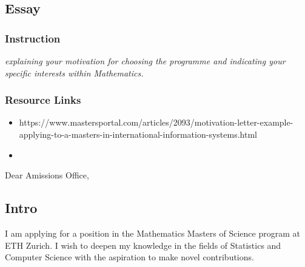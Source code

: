 \subsection*{Essay}\label{sec:essay}

\subsubsection*{Instruction}
\textit{explaining your motivation for choosing the programme and indicating your specific interests within Mathematics.}

\subsubsection*{Resource Links}
\begin{itemize}
    \item https://www.mastersportal.com/articles/2093/motivation-letter-example-applying-to-a-masters-in-international-information-systems.html
    \item 
\end{itemize}

Dear Amissions Office,\\
\subsection*{Intro}
I am applying for a position in the Mathematics Masters of Science program at ETH Zurich. I wish to deepen my knowledge in the fields of Statistics and Computer Science with the aspiration to make novel contributions.\\
\\
